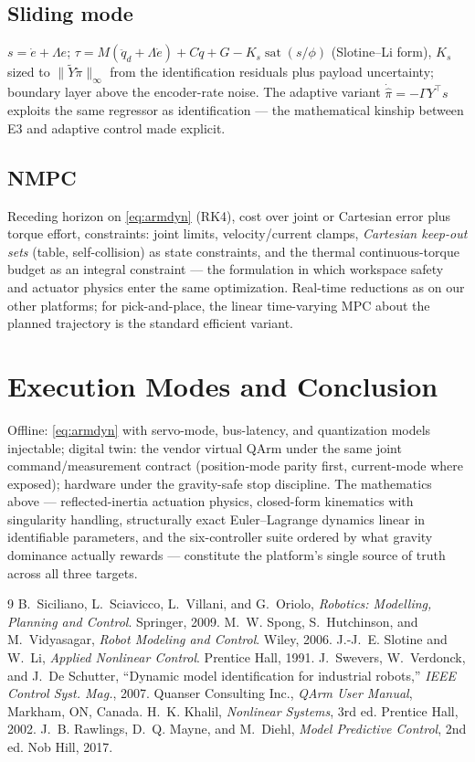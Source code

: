 \documentclass[conference]{IEEEtran}
\newcommand{\sat}{\operatorname{sat}}
\begin{document}
\subsection{Sliding mode}
$s = \dot e + \Lambda e$; $\tau = M(\ddot q_d + \Lambda\dot e) + C\dot q + G - K_s\sat(s/\phi)$ (Slotine--Li form), $K_s$ sized to $\|\tilde Y\tilde\pi\|_\infty$ from the identification residuals plus payload uncertainty; boundary layer above the encoder-rate noise. The adaptive variant $\dot{\hat\pi} = -\Gamma Y^{\!\top}s$ exploits the same regressor as identification --- the mathematical kinship between E3 and adaptive control made explicit.

\subsection{NMPC}
Receding horizon on \eqref{eq:armdyn} (RK4), cost over joint or Cartesian error plus torque effort, constraints: joint limits, velocity/current clamps, \emph{Cartesian keep-out sets} (table, self-collision) as state constraints, and the thermal continuous-torque budget as an integral constraint --- the formulation in which workspace safety and actuator physics enter the same optimization. Real-time reductions as on our other platforms; for pick-and-place, the linear time-varying MPC about the planned trajectory is the standard efficient variant.

\section{Execution Modes and Conclusion}
Offline: \eqref{eq:armdyn} with servo-mode, bus-latency, and quantization models injectable; digital twin: the vendor virtual QArm under the same joint command/measurement contract (position-mode parity first, current-mode where exposed); hardware under the gravity-safe stop discipline. The mathematics above --- reflected-inertia actuation physics, closed-form kinematics with singularity handling, structurally exact Euler--Lagrange dynamics linear in identifiable parameters, and the six-controller suite ordered by what gravity dominance actually rewards --- constitute the platform's single source of truth across all three targets.


\begin{thebibliography}{9}
 B.~Siciliano, L.~Sciavicco, L.~Villani, and G.~Oriolo, \emph{Robotics: Modelling, Planning and Control}. Springer, 2009.
 M.~W. Spong, S.~Hutchinson, and M.~Vidyasagar, \emph{Robot Modeling and Control}. Wiley, 2006.
 J.-J.~E. Slotine and W.~Li, \emph{Applied Nonlinear Control}. Prentice Hall, 1991.
 J.~Swevers, W.~Verdonck, and J.~De Schutter, ``Dynamic model identification for industrial robots,'' \emph{IEEE Control Syst. Mag.}, 2007.
 Quanser Consulting Inc., \emph{QArm User Manual}, Markham, ON, Canada.
 H.~K. Khalil, \emph{Nonlinear Systems}, 3rd ed. Prentice Hall, 2002.
 J.~B. Rawlings, D.~Q. Mayne, and M.~Diehl, \emph{Model Predictive Control}, 2nd ed. Nob Hill, 2017.
\end{thebibliography}
\end{document}
